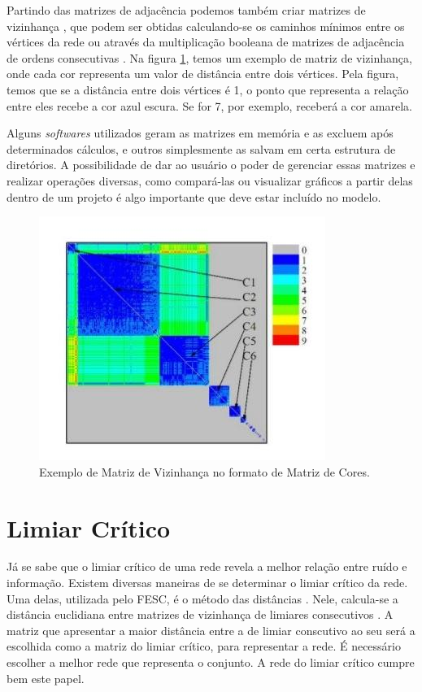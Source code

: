 Partindo das matrizes de adjacência podemos também criar matrizes de vizinhança \cite{andrade2009}, que podem ser obtidas calculando-se os caminhos mínimos
\cite{bessa2008} entre os vértices da rede ou através da multiplicação booleana de matrizes de adjacência de ordens consecutivas \cite{andrade2006}. Na figura 
\ref{fig:matriz-vizinhanca}, temos um exemplo de matriz de vizinhança, onde cada cor representa um valor de distância entre dois vértices. Pela figura, temos
que se a distância entre dois vértices é 1, o ponto que representa a relação entre eles recebe a cor azul escura. Se for 7, por exemplo, receberá a cor
amarela.

Alguns \textit{softwares} utilizados geram as matrizes em memória e as excluem após determinados cálculos, e outros simplesmente as salvam em certa estrutura
de diretórios. A possibilidade de dar ao usuário o poder de gerenciar essas matrizes e realizar operações diversas, como compará-las ou visualizar gráficos
a partir delas dentro de um projeto é algo importante que deve estar incluído no modelo.

\begin{figure}
\centering
\includegraphics[scale=0.53]{matriz-vizinhanca}
\caption{Exemplo de Matriz de Vizinhança no formato de Matriz de Cores.}
\label{fig:matriz-vizinhanca}
\end{figure}

\section{Limiar Crítico} \label{sec:limcrit}

Já se sabe que o limiar crítico de uma rede revela a melhor relação entre ruído e informação. Existem diversas maneiras de se determinar o limiar
crítico da rede. Uma delas, utilizada pelo FESC, é o método das distâncias \cite{andrade2011}. Nele, calcula-se a distância euclidiana entre matrizes de
vizinhança de limiares consecutivos \cite{andrade2008}. A matriz que apresentar a maior distância entre a de limiar conscutivo
ao seu será a escolhida como a matriz do limiar crítico, para representar a rede. É necessário escolher a melhor rede que representa o conjunto.
A rede do limiar crítico cumpre bem este papel.

